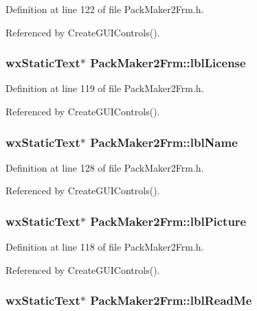 Definition at line 122 of file Pack\-Maker2Frm.h.

Referenced by Create\-GUIControls().
\subsubsection{\setlength{\rightskip}{0pt plus 5cm}wx\-Static\-Text$\ast$ {\bf Pack\-Maker2Frm::lbl\-License}\hspace{0.3cm}{\tt  [private]}}\label{class_pack_maker2_frm_18833f5596b52a118a78982edab0af23}




Definition at line 119 of file Pack\-Maker2Frm.h.

Referenced by Create\-GUIControls().
\subsubsection{\setlength{\rightskip}{0pt plus 5cm}wx\-Static\-Text$\ast$ {\bf Pack\-Maker2Frm::lbl\-Name}\hspace{0.3cm}{\tt  [private]}}\label{class_pack_maker2_frm_efffa35e8df17123ee9164dac6a60b37}




Definition at line 128 of file Pack\-Maker2Frm.h.

Referenced by Create\-GUIControls().
\subsubsection{\setlength{\rightskip}{0pt plus 5cm}wx\-Static\-Text$\ast$ {\bf Pack\-Maker2Frm::lbl\-Picture}\hspace{0.3cm}{\tt  [private]}}\label{class_pack_maker2_frm_4640f997d5dfc78b6069ba38011265f1}




Definition at line 118 of file Pack\-Maker2Frm.h.

Referenced by Create\-GUIControls().
\subsubsection{\setlength{\rightskip}{0pt plus 5cm}wx\-Static\-Text$\ast$ {\bf Pack\-Maker2Frm::lbl\-Read\-Me}\hspace{0.3cm}{\tt  [private]}}\label{class_pack_maker2_frm_93d0ba52916260d1590b2b8bbcb3b21a}




